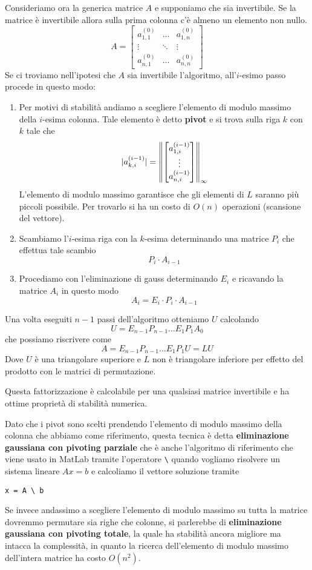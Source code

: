 Consideriamo ora la generica matrice $A$ e supponiamo che sia invertibile. Se la matrice è invertibile allora
sulla prima colonna c'è almeno un elemento non nullo.
\[
	A = \begin{bmatrix}
		a_{1,1}^{(0)} & \dots  & a_{1,n}^{(0)} \\
		\vdots        & \ddots & \vdots        \\
		a_{n,1}^{(0)} & \dots  & a_{n,n}^{(0)}
	\end{bmatrix}
\]
Se ci troviamo nell'ipotesi che $A$ sia invertibile l'algoritmo, all'$i$-esimo passo procede in questo modo:
\begin{enumerate}
	\item Per motivi di stabilità andiamo a scegliere l'elemento di modulo massimo della $i$-esima colonna.
	      Tale elemento è detto \textbf{pivot} e si trova sulla riga $k$ con $k$ tale che
	      \[
		      | a_{k,i}^{(i-1)} | = \left\lVert
			      \begin{bmatrix}
				      a_{1,i}^{(i-1)} \\ \vdots \\ a_{n,i}^{(i-1)}
			      \end{bmatrix}\right\rVert_\infty
	      \]
	      L'elemento di modulo massimo garantisce che gli elementi di $L$ saranno più piccoli possibile. Per
	      trovarlo si ha un costo di $O(n)$ operazioni (scansione del vettore).
	\item Scambiamo l'$i$-esima riga con la $k$-esima determinando una matrice $P_i$ che effettua tale scambio
	      \[ P_i \cdot A_{i-1} \]
	\item Procediamo con l'eliminazione di gauss determinando $E_i$ e ricavando la matrice $A_i$ in questo modo
	      \[ A_i = E_i \cdot P_i \cdot A_{i-1} \]
\end{enumerate}
Una volta eseguiti $n-1$ passi dell'algoritmo otteniamo $U$ calcolando
\[ U = E_{n-1} P_{n-1} \dots E_1 P_1 A_0 \]
che possiamo riscrivere come
\[ A = E_{n-1} P_{n-1} \dots E_1 P_1 U = L U \]
Dove $U$ è una triangolare superiore e $L$ non è triangolare inferiore per effetto del prodotto con le matrici
di permutazione.

Questa fattorizzazione è calcolabile per una qualsiasi matrice invertibile e ha ottime proprietà di stabilità
numerica.

Dato che i pivot sono scelti prendendo l'elemento di modulo massimo della colonna che abbiamo come
riferimento, questa tecnica è detta \textbf{eliminazione gaussiana con pivoting parziale} che è anche l'algoritmo
di riferimento che viene usato in MatLab tramite l'operatore \verb|\| quando vogliamo risolvere un sistema lineare
$Ax = b$ e calcoliamo il vettore soluzione tramite
\begin{center}
	\verb|x = A \ b|
\end{center}
Se invece andassimo a scegliere l'elemento di modulo massimo su tutta la matrice dovremmo permutare sia righe
che colonne, si parlerebbe di \textbf{eliminazione gaussiana con pivoting totale}, la quale ha stabilità ancora
migliore ma intacca la complessità, in quanto la ricerca dell'elemento di modulo massimo dell'intera matrice ha
costo $O(n^2)$.

